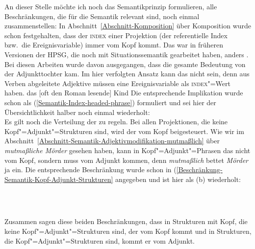 An dieser Stelle möchte ich noch das Semantikprinzip formulieren, \dash alle Beschränkungen, die für
die Semantik relevant sind, noch einmal zusammenstellen: In Abschnitt~\ref{Abschnitt-Komposition} über Komposition wurde schon
festgehalten, dass der \textsc{index} einer Projektion (der referentielle Index bzw.\ die
Ereignisvariable) immer vom Kopf kommt. Das war in früheren Versionen der HPSG, die noch mit
Situationssemantik gearbeitet haben, anders \citep{ps2}. Bei diesen Arbeiten wurde davon
ausgegangen, dass die gesamte Bedeutung von der Adjunkttochter kam. Im hier verfolgten Ansatz kann
das nicht sein, denn aus Verben abgeleitete Adjektive müssen eine Ereignisvariable als
\textsc{index}"=Wert haben.
\ea
das [oft den Roman lesende] Kind
\z
Die entsprechende Implikation wurde schon als (\ref{Semantik-Index-headed-phrase}) formuliert und
sei hier der Übersichtlichkeit halber noch einmal wiederholt:
\ea
\label{Semantik-Index-headed-phrase2}\label{Semantikprinzip-IND}
 \impl\\
\z
Es gilt noch die Verteilung der \ltopwe zu regeln. Bei allen Projektionen, die keine
Kopf"=Adjunkt"=Strukturen sind, wird der \ltopw vom Kopf beigesteuert. Wie wir im Abschnitt~\ref{Abschnitt-Semantik-Adjektivmodifikation-mutmaßlich}
über \emph{mutmaßliche Mörder} gesehen haben, kann in Kopf"=Adjunkt"=Phrasen das \ltop nicht vom
Kopf, sondern muss vom Adjunkt kommen, denn \emph{mutmaßlich} bettet \emph{Mörder} ja ein. Die
entsprechende Beschränkung wurde schon in (\ref{Beschränkung-Semantik-Kopf-Adjunkt-Strukturen}
angegeben und ist hier als (b) wiederholt:

\eal
\label{Semantikprinzip-LTOP}
\ex {} \impl\\
\ex
\label{Beschränkung-Semantik-Kopf-Adjunkt-Strukturen2} 
 \impl\\

\zl 
Zusammen sagen diese beiden Beschränkungen, dass in Strukturen mit Kopf, die keine
Kopf"=Adjunkt"=Strukturen sind, der \ltopw vom Kopf kommt und in Strukturen, die
Kopf"=Adjunkt"=Strukturen sind, kommt er vom Adjunkt.

